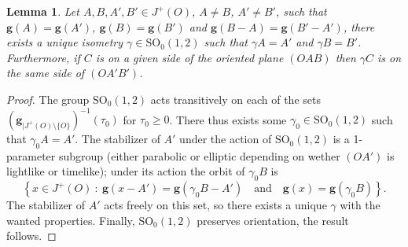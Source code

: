 \documentclass[a4paper,12pt]{article}
\def\SO{\mathrm{SO}}
\def\SO{\mathrm{SO}}
\def\quadform{\mathbf{g}}
\newtheorem{lem}{Lemma}[section]		 %
\theoremstyle{definition}
\begin{document}
							\begin{lem} \label{lem:isom_equiv}
							Let $A,B,A',B' \in J^+(O)$, $A\neq B$, $A'\neq B'$, such that $\quadform(A)=\quadform(A')$, $\quadform(B)=\quadform(B')$ and $\quadform(B-A)=\quadform(B'-A')$, there exists a unique isometry $\gamma\in \SO_0(1,2)$ such that 
							$\gamma A = A'$ and $\gamma B=B'$. Furthermore, if $C$ is on a given side of the oriented plane $(OAB)$ then $\gamma C$ is on the same side of $(OA'B')$.
							\end{lem}
							\begin{proof}
							 The group $\SO_0(1,2)$ acts transitively on each of the sets $(\quadform_{|J^+(O)\setminus \{O\}})^{-1}(\tau_0)$ for $\tau_0\geq0$. There thus exists some $\gamma_0\in \SO_0(1,2)$ such that $\gamma_0 A = A'$. The stabilizer of $A'$ under the action of $\SO_0(1,2)$ is a 1-parameter subgroup (either parabolic or elliptic depending on wether $(OA')$ is lightlike or timelike); under its action the orbit of $\gamma_0 B$ is $$\left\{x \in J^+(O)~:~ \quadform(x-A') = \quadform\left(\gamma_0 B-A'\right) \quad \text{and} \quad \quadform(x)= \quadform(\gamma_0 B)\right\}.$$
							 The stabilizer of $A'$ acts freely on this set, so there exists a unique $\gamma$ with the wanted properties. Finally, $\SO_0(1,2)$ preserves orientation, the result follows.
							\end{proof}
								
\end{document}
